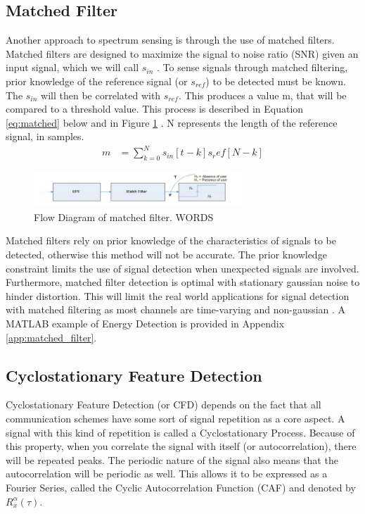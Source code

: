 \subsection{Matched Filter}
Another approach to spectrum sensing is through the use of matched filters. Matched filters are designed to maximize the signal to noise ratio (SNR) given an input signal, which we will call $s_{in}$ \cite{sensing_energy}. To sense signals through matched filtering, prior knowledge of the reference signal (or $s_{ref}$) to be detected must be known. The $s_{in}$ will then be correlated with $s_{ref}$. This produces a value m, that will be compared to a threshold value. This process is described in Equation \ref{eq:matched} below and in Figure \ref{figure:matched_filter}
. N represents the length of the reference signal, in samples. 
\begin{align} \label{eq:matched}
    m &= \sum_{k = 0}^{N}s_{in}[t-k]s_ref[N-k] 
\end{align}
\begin{figure}[ht]
\centering
\includegraphics[width=0.70\textwidth]{img/match_filter.png}
\caption{Flow Diagram of matched filter. WORDS}
\label{figure:matched_filter}
\end{figure}\par
Matched filters rely on prior knowledge of the characteristics of signals to be detected, otherwise this method will not be accurate. The prior knowledge constraint limits the use of signal detection when unexpected signals are involved. Furthermore, matched filter detection is optimal with stationary gaussian noise to hinder distortion. This will limit the real world applications for signal detection with matched filtering as most channels are time-varying and non-gaussian \cite{channel_fade}. A MATLAB example of Energy Detection is provided in Appendix \ref{app:matched_filter}.

\subsection{Cyclostationary Feature Detection} \label{Cyclostationary Feature Detection}
Cyclostationary Feature Detection (or CFD) depends on the fact that all communication schemes have some sort of signal repetition as a core aspect. A signal with this kind of repetition is called a Cyclostationary Process\cite{cyclostat_journal}. Because of this property, when you correlate the signal with itself (or autocorrelation), there will be repeated peaks. The periodic nature of the signal also means that the autocorrelation will be periodic as well. This allows it to be expressed as a Fourier Series, called the Cyclic Autocorrelation Function (CAF) and denoted by $R_x^\alpha(\tau)$\cite{cyclostat_text}.\par 

